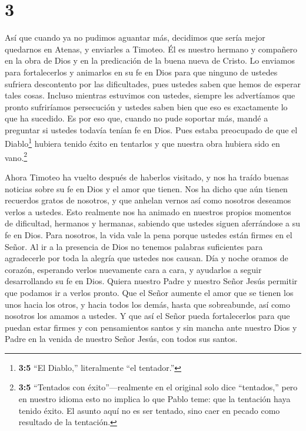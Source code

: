 \hypertarget{section-2}{%
\section{3}\label{section-2}}

 Así que cuando ya no pudimos aguantar más, decidimos que
sería mejor quedarnos en Atenas,  y enviarles a Timoteo. Él
es nuestro hermano y compañero en la obra de Dios y en la predicación de
la buena nueva de Cristo. Lo enviamos para fortalecerlos y animarlos en
su fe en Dios  para que ninguno de ustedes sufriera
descontento por las dificultades, pues ustedes saben que hemos de
esperar tales cosas.  Incluso mientras estuvimos con
ustedes, siempre les advertíamos que pronto sufriríamos persecución y
ustedes saben bien que eso es exactamente lo que ha sucedido.
 Es por eso que, cuando no pude soportar más, mandé a
preguntar si ustedes todavía tenían fe en Dios. Pues estaba preocupado
de que el Diablo\footnote{\textbf{3:5} ``El Diablo,'' literalmente ``el
  tentador.''} hubiera tenido éxito en tentarlos y que nuestra obra
hubiera sido en vano.\footnote{\textbf{3:5} ``Tentados con
  éxito''---realmente en el original solo dice ``tentados,'' pero en
  nuestro idioma esto no implica lo que Pablo teme: que la tentación
  haya tenido éxito. El asunto aquí no es ser tentado, sino caer en
  pecado como resultado de la tentación.}

 Ahora Timoteo ha vuelto después de haberlos visitado, y nos
ha traído buenas noticias sobre su fe en Dios y el amor que tienen. Nos
ha dicho que aún tienen recuerdos gratos de nosotros, y que anhelan
vernos así como nosotros deseamos verlos a ustedes.  Esto
realmente nos ha animado en nuestros propios momentos de dificultad,
hermanos y hermanas, sabiendo que ustedes siguen aferrándose a su fe en
Dios.  Para nosotros, la vida vale la pena porque ustedes
están firmes en el Señor.  Al ir a la presencia de Dios no
tenemos palabras suficientes para agradecerle por toda la alegría que
ustedes nos causan.  Día y noche oramos de corazón,
esperando verlos nuevamente cara a cara, y ayudarlos a seguir
desarrollando su fe en Dios.  Quiera nuestro Padre y
nuestro Señor Jesús permitir que podamos ir a verlos pronto.
 Que el Señor aumente el amor que se tienen los unos hacia
los otros, y hacia todos los demás, hasta que sobreabunde, así como
nosotros los amamos a ustedes.  Y que así el Señor pueda
fortalecerlos para que puedan estar firmes y con pensamientos santos y
sin mancha ante nuestro Dios y Padre en la venida de nuestro Señor
Jesús, con todos sus santos.


